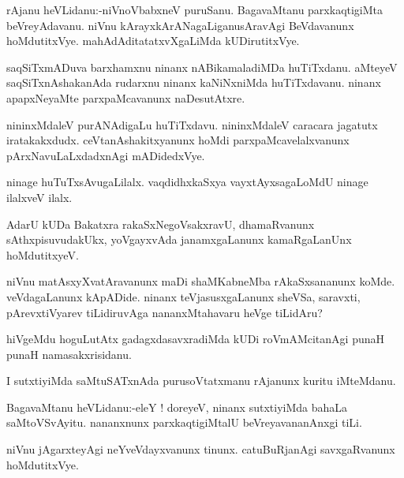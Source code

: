 \documentclass{article}
\begin{document}
\begin{mn}%
rAjanu heVLidanu:-niVnoVbabxneV puruSanu. BagavaMtanu parxkaqtigiMta beVreyAdavanu. niVnu 
kArayxkArANagaLiganusAravAgi BeVdavanunx hoMdutitxVye. mahAdAditatatxvXgaLiMda kUDirutitxVye.
\end{mn}

\begin{mn}%
saqSiTxmADuva barxhamxnu ninanx nABikamaladiMDa huTiTxdanu. aMteyeV saqSiTxnAshakanAda 
rudarxnu ninanx kaNiNxniMda huTiTxdavanu. ninanx apapxNeyaMte parxpaMcavanunx naDesutAtxre.
\end{mn}

\begin{mn}%
nininxMdaleV purANAdigaLu huTiTxdavu. nininxMdaleV caracara jagatutx iratakakxdudx. 
ceVtanAshakitxyanunx  hoMdi parxpaMcavelalxvanunx pArxNavuLaLxdadxnAgi mADidedxVye.
\end{mn}

\begin{mn}%
ninage huTuTxsAvugaLilalx. vaqdidhxkaSxya vayxtAyxsagaLoMdU ninage ilalxveV ilalx.
\end{mn}

\begin{mn}%
AdarU kUDa Bakatxra rakaSxNegoVsakxravU, dhamaRvanunx sAthxpisuvudakUkx, yoVgayxvAda 
janamxgaLanunx kamaRgaLanUnx hoMdutitxyeV.
\end{mn}

\begin{mn}%
niVnu matAsxyXvatAravanunx maDi shaMKabneMba rAkaSxsananunx koMde. veVdagaLanunx kApADide. 
ninanx teVjasusxgaLanunx sheVSa, saravxti, pArevxtiVyarev tiLidiruvAga nananxMtahavaru 
heVge tiLidAru? 
\end{mn}

\begin{mn}%
hiVgeMdu hoguLutAtx gadagxdasavxradiMda kUDi roVmAMcitanAgi punaH punaH namasakxrisidanu.
\end{mn}

\begin{mn}%
I sutxtiyiMda saMtuSATxnAda purusoVtatxmanu rAjanunx kuritu iMteMdanu. 
\end{mn}

\begin{mn}%
BagavaMtanu heVLidanu:-eleY ! doreyeV, ninanx sutxtiyiMda bahaLa saMtoVSvAyitu. nananxnunx
parxkaqtigiMtalU beVreyavananAnxgi tiLi.
\end{mn}

\begin{mn}%
niVnu jAgarxteyAgi neYveVdayxvanunx tinunx. catuBuRjanAgi savxgaRvanunx hoMdutitxVye.
\end{mn}
\end{document}
